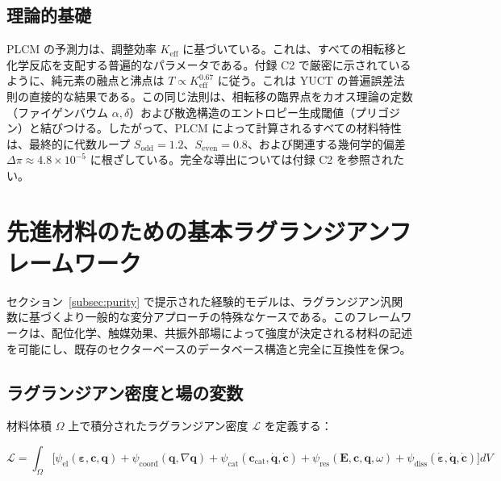 \documentclass[11pt,a4paper]{article}
\theoremstyle{remark}
\begin{document}
	\subsection{理論的基礎}
	
	PLCM の予測力は、調整効率 $K_{\mathrm{eff}}$ に基づいている。これは、すべての相転移と化学反応を支配する普遍的なパラメータである。付録 C2 で厳密に示されているように、純元素の融点と沸点は $T \propto K_{\mathrm{eff}}^{0.67}$ に従う。これは YUCT の普遍誤差法則の直接的な結果である。この同じ法則は、相転移の臨界点をカオス理論の定数（ファイゲンバウム $\alpha,\delta$）および散逸構造のエントロピー生成閾値（プリゴジン）と結びつける。したがって、PLCM によって計算されるすべての材料特性は、最終的に代数ループ $S_{\mathrm{odd}}=1.2$、$S_{\mathrm{even}}=0.8$、および関連する幾何学的偏差 $\Delta\pi \approx 4.8\times10^{-5}$ に根ざしている。完全な導出については付録 C2 を参照されたい。
	
	\section{先進材料のための基本ラグランジアンフレームワーク}
	\label{sec:lagrangian}
	
	セクション~\ref{subsec:purity} で提示された経験的モデルは、ラグランジアン汎関数に基づくより一般的な変分アプローチの特殊なケースである。このフレームワークは、配位化学、触媒効果、共振外部場によって強度が決定される材料の記述を可能にし、既存のセクターベースのデータベース構造と完全に互換性を保つ。
	
	\subsection{ラグランジアン密度と場の変数}
	\label{subsec:lagrangian-density}
	
	材料体積 $\Omega$ 上で積分されたラグランジアン密度 $\mathcal{L}$ を定義する：
	
	\[
	\mathcal{L} = \int_{\Omega} \Big[ 
	\psi_{\mathrm{el}}(\boldsymbol{\varepsilon}, \mathbf{c}, \mathbf{q}) 
	+ \psi_{\mathrm{coord}}(\mathbf{q}, \nabla\mathbf{q}) 
	+ \psi_{\mathrm{cat}}(\mathbf{c}_{\mathrm{cat}}, \dot{\mathbf{q}}, \dot{\mathbf{c}}) 
	+ \psi_{\mathrm{res}}(\mathbf{E}, \mathbf{c}, \mathbf{q}, \omega) 
	+ \psi_{\mathrm{diss}}(\dot{\boldsymbol{\varepsilon}}, \dot{\mathbf{q}}, \dot{\mathbf{c}})
	\Big] dV
	\]
	
\end{document}
